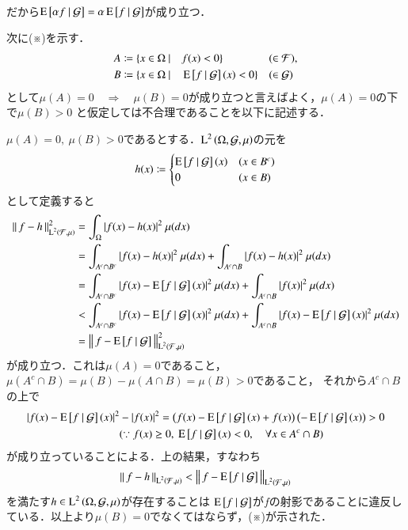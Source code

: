 \begin{prf}
\begin{description}
\begin{prf}
\begin{align}
					\end{align}
					だから$\operatorname{E} \left[ \alpha f \ \middle|\ \mathcal{G} \right] = \alpha \operatorname{E} \left[ f \ \middle|\ \mathcal{G} \right]$が成り立つ．
					\QED
				\end{prf}
				次に(※)を示す．
				\begin{align}
					A &\coloneqq \{x \in \Omega\ |\quad f(x) < 0 \} && (\in \mathcal{F}), \\
					B &\coloneqq \{x \in \Omega\ |\quad \operatorname{E} \left[ f \ \middle|\ \mathcal{G} \right](x) < 0 \} && (\in \mathcal{G})
				\end{align}
				として$\mu(A)=0 \quad \Rightarrow \quad \mu(B)=0$が成り立つと言えばよく，$\mu(A) = 0$の下で$\mu(B) > 0$
				と仮定しては不合理であることを以下に記述する．
				
				$\mu(A) = 0,\ \mu(B) > 0$であるとする．$\operatorname{L}^{2} \left(\Omega, \mathcal{G},\mu\right)$の元を
				\begin{align}
					h(x) \coloneqq
					\begin{cases}
						\operatorname{E} \left[ f \ \middle|\ \mathcal{G} \right](x) & (x \in B^c) \\
						0 & (x \in B)
					\end{cases}
				\end{align}
				として定義すると
				\begin{align}
					\Norm{f - h}{\Lp{2}{\mathcal{F},\mu}}^2 &= \int_{\Omega} |f(x) - h(x)|^2\ \mu(dx) \\
					&= \int_{A^c \cap B^c} |f(x) - h(x)|^2\ \mu(dx) + \int_{A^c \cap B} |f(x) - h(x)|^2\ \mu(dx) \\
					&= \int_{A^c \cap B^c} |f(x) - \cexp{f}{\mathcal{G}}(x)|^2\ \mu(dx) + \int_{A^c \cap B} |f(x)|^2\ \mu(dx) \\
					&< \int_{A^c \cap B^c} |f(x) - \cexp{f}{\mathcal{G}}(x)|^2\ \mu(dx) + \int_{A^c \cap B} |f(x) - \cexp{f}{\mathcal{G}}(x)|^2\ \mu(dx) \\
					&= \Norm{f - \cexp{f}{\mathcal{G}}}{\Lp{2}{\mathcal{F},\mu}}^2
				\end{align}
				が成り立つ．これは$\mu(A) = 0$であること，$\mu(A^c \cap B) = \mu(B) - \mu(A \cap B) = \mu(B) > 0$であること，
				それから$A^c \cap B$の上で
				\begin{align}
					|f(x) - \cexp{f}{\mathcal{G}}(x)|^2 &- |f(x)|^2 = \left(f(x) - \cexp{f}{\mathcal{G}}(x) + f(x)\right)\left(- \cexp{f}{\mathcal{G}}(x)\right) > 0 \\
					&(\because f(x) \geq 0,\ \cexp{f}{\mathcal{G}}(x) < 0, \quad \forall x \in A^c \cap B)
				\end{align}
				が成り立っていることによる．上の結果，すなわち
				\begin{align}
					\left\|\, f - h\, \right\|_{\operatorname{L}^{2} \left(\mathcal{F},\mu\right)} < \left\|\, f - \operatorname{E} \left[ f \ \middle|\ \mathcal{G} \right]\, \right\|_{\operatorname{L}^{2} \left(\mathcal{F},\mu\right)}
				\end{align}
				を満たす$h \in \operatorname{L}^{2} \left(\Omega, \mathcal{G},\mu\right)$が存在することは
				$\operatorname{E} \left[ f \ \middle|\ \mathcal{G} \right]$が$f$の射影であることに違反している．以上より$\mu(B) = 0$でなくてはならず，(※)が示された．
			

\end{description}
\end{prf}
